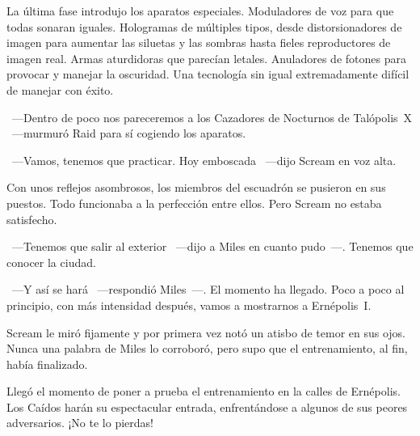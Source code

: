 La última fase introdujo los aparatos especiales. Moduladores de voz para que todas sonaran iguales. Hologramas de múltiples tipos, desde distorsionadores de imagen para aumentar las siluetas y las sombras hasta fieles reproductores de imagen real. Armas aturdidoras que parecían letales. Anuladores de fotones para provocar y manejar la oscuridad. Una tecnología sin igual extremadamente difícil de manejar con éxito.

~---Dentro de poco nos pareceremos a los Cazadores de Nocturnos de Talópolis~X ~---murmuró Raid para sí cogiendo los aparatos.

~---Vamos, tenemos que practicar. Hoy emboscada ~---dijo Scream en voz alta.

Con unos reflejos asombrosos, los miembros del escuadrón se pusieron en sus puestos. Todo funcionaba a la perfección entre ellos. Pero Scream no estaba satisfecho.

~---Tenemos que salir al exterior ~---dijo a Miles en cuanto pudo~---. Tenemos que conocer la ciudad.

~---Y así se hará ~---respondió Miles~---. El momento ha llegado. Poco a poco al principio, con más intensidad después, vamos a mostrarnos a Ernépolis~I.

Scream le miró fijamente y por primera vez notó un atisbo de temor en sus ojos. Nunca una palabra de Miles lo corroboró, pero supo que el entrenamiento, al fin, había finalizado.

\begin{next}
    Llegó el momento de poner a prueba el entrenamiento en la calles de Ernépolis. Los Caídos harán su espectacular entrada, enfrentándose a algunos de sus peores adversarios. ¡No te lo pierdas!
\end{next}

\endinput
